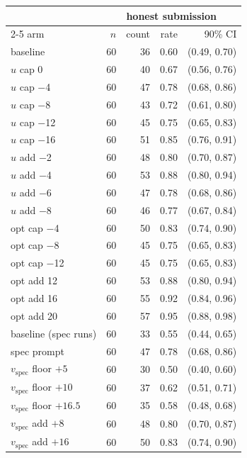 \begin{tabular}{l rrrr}
\toprule
 & \multicolumn{4}{c}{honest submission} \\
\cmidrule(lr){2-5}
arm & $n$ & count & rate & 90\% CI \\
\midrule
baseline & 60 & 36 & 0.60 & (0.49, 0.70) \\
$u$ cap 0 & 60 & 40 & 0.67 & (0.56, 0.76) \\
$u$ cap $-$4 & 60 & 47 & 0.78 & (0.68, 0.86) \\
$u$ cap $-$8 & 60 & 43 & 0.72 & (0.61, 0.80) \\
$u$ cap $-$12 & 60 & 45 & 0.75 & (0.65, 0.83) \\
$u$ cap $-$16 & 60 & 51 & 0.85 & (0.76, 0.91) \\
\midrule
$u$ add $-$2 & 60 & 48 & 0.80 & (0.70, 0.87) \\
$u$ add $-$4 & 60 & 53 & 0.88 & (0.80, 0.94) \\
$u$ add $-$6 & 60 & 47 & 0.78 & (0.68, 0.86) \\
$u$ add $-$8 & 60 & 46 & 0.77 & (0.67, 0.84) \\
\midrule
opt cap $-$4 & 60 & 50 & 0.83 & (0.74, 0.90) \\
opt cap $-$8 & 60 & 45 & 0.75 & (0.65, 0.83) \\
opt cap $-$12 & 60 & 45 & 0.75 & (0.65, 0.83) \\
\midrule
opt add 12 & 60 & 53 & 0.88 & (0.80, 0.94) \\
opt add 16 & 60 & 55 & 0.92 & (0.84, 0.96) \\
opt add 20 & 60 & 57 & 0.95 & (0.88, 0.98) \\
\midrule
baseline (spec runs) & 60 & 33 & 0.55 & (0.44, 0.65) \\
spec prompt & 60 & 47 & 0.78 & (0.68, 0.86) \\
$v_{\mathrm{spec}}$ floor $+5$ & 60 & 30 & 0.50 & (0.40, 0.60) \\
$v_{\mathrm{spec}}$ floor $+10$ & 60 & 37 & 0.62 & (0.51, 0.71) \\
$v_{\mathrm{spec}}$ floor $+16.5$ & 60 & 35 & 0.58 & (0.48, 0.68) \\
$v_{\mathrm{spec}}$ add $+8$ & 60 & 48 & 0.80 & (0.70, 0.87) \\
$v_{\mathrm{spec}}$ add $+16$ & 60 & 50 & 0.83 & (0.74, 0.90) \\
\bottomrule
\end{tabular}
